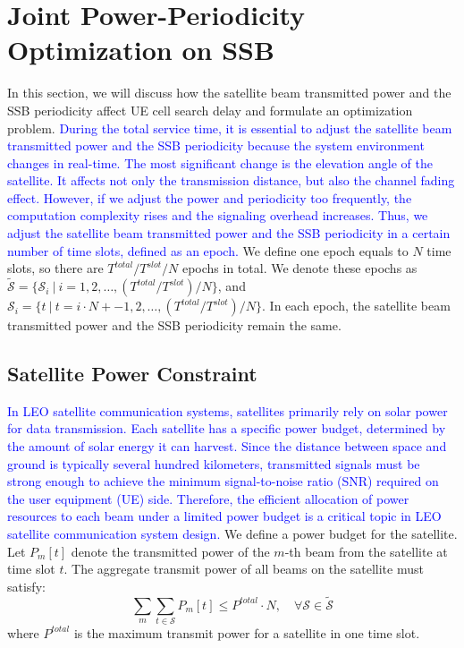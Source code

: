 \section{Joint Power-Periodicity Optimization on SSB}
In this section, we will discuss how the satellite beam transmitted power and the SSB periodicity affect UE cell search delay and formulate an optimization problem. 
\textcolor{blue}{During the total service time, it is essential to adjust the satellite beam transmitted power and the SSB periodicity because the system environment changes in real-time. The most significant change is the elevation angle of the satellite. It affects not only the transmission distance, but also the channel fading effect. However, if we adjust the power and periodicity too frequently, the computation complexity rises and the signaling overhead increases. Thus, we adjust the satellite beam transmitted power and the SSB periodicity in a certain number of time slots, defined as an epoch.} We define one epoch equals to $N$ time slots, so there are $T^{total} / T^{slot} / N$ epochs in total. We denote these epochs as $\mathcal{\widetilde{S}} = \{\mathcal{S}_i\ |\ i = 1, 2, \ldots, (T^{total} / T^{slot}) / N\}$, and $\mathcal{S}_i = \{t\ |\ t = i \cdot N + -1, 2, \ldots, (T^{total} / T^{slot}) / N\}$. In each epoch, the satellite beam transmitted power and the SSB periodicity remain the same. 

\subsection{Satellite Power Constraint}

\textcolor{blue}{In LEO satellite communication systems, satellites primarily rely on solar power for data transmission. Each satellite has a specific power budget, determined by the amount of solar energy it can harvest. Since the distance between space and ground is typically several hundred kilometers, transmitted signals must be strong enough to achieve the minimum signal-to-noise ratio (SNR) required on the user equipment (UE) side. Therefore, the efficient allocation of power resources to each beam under a limited power budget is a critical topic in LEO satellite communication system design.}
We define a power budget for the satellite. Let $P_{m}[t]$ denote the transmitted power of the $m$-th beam from the satellite at time slot $t$. The aggregate transmit power of all beams on the satellite must satisfy:
\begin{equation}
    \sum_{m} \sum_{t \in \mathcal{S}} P_{m}[t] \leq P^{total} \cdot N, \quad \forall \mathcal{S} \in \mathcal{\widetilde{S}}
\end{equation}
where $P^{total}$ is the maximum transmit power for a satellite in one time slot.

